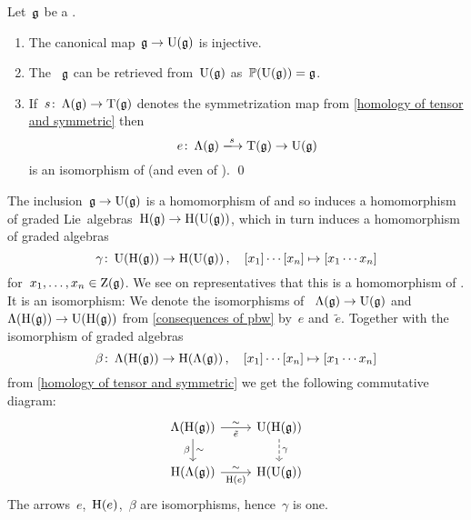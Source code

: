 \documentclass[a4paper,10pt,headings=standardclasses]{scrartcl}
\begin{document}
\begin{corollary}
  \label{consequences of pbw}
  Let~$\mathfrak{g}$ be a {\dgl}.
  \begin{enumerate}
    \item
      The canonical map~$\mathfrak{g} \to \operatorname{U}(\mathfrak{g})$ is injective.
    \item
      The {\dgl}~$\mathfrak{g}$ can be retrieved from~$\operatorname{U}(\mathfrak{g})$ as~$\mathbb{P}(\operatorname{U}(\mathfrak{g})) = \mathfrak{g}$.
    \item
      If~$s \colon \operatorname{\Lambda}(\mathfrak{g}) \to \operatorname{T}(\mathfrak{g})$ denotes the symmetrization map from \cref{homology of tensor and symmetric} then
      \[
        e
        \colon
        \dgSymm(\glie)
        \xlongto{s}
        \dgTensor(\glie)
        \to
        \Univ(\glie)
      \]
      is an isomorphism of {\dgvs} (and even of {\dgc}).
    \qed
  \end{enumerate}
\end{corollary}

\begin{example}
  The inclusion~$\mathfrak{g} \to \operatorname{U}(\mathfrak{g})$ is a homomorphism of {\dgl} and so induces a homomorphism of graded Lie~algebras~$\operatorname{H}(\mathfrak{g}) \to \operatorname{H}(\operatorname{U}(\mathfrak{g}))$, which in turn induces a homomorphism of graded algebras
  \[
    \gamma
    \colon
    \operatorname{U}(\operatorname{H}(\mathfrak{g}))
    \to
    \operatorname{H}(\operatorname{U}(\mathfrak{g})) \,,
    \quad
    [x_1] \dotsm [x_n]
    \mapsto
    [x_1 \dotsm x_n]
  \]
  for~$x_1, \dotsc, x_n \in \operatorname{Z}(\mathfrak{g})$.
  We see on representatives that this is a homomorphism of {\dghs}.
  It is an isomorphism:  
  We denote the isomorphisms of {\dgvs}~$\operatorname{\Lambda}(\mathfrak{g}) \to \operatorname{U}(\mathfrak{g})$ and~$\operatorname{\Lambda}(\operatorname{H}(\mathfrak{g})) \to \operatorname{U}(\operatorname{H}(\mathfrak{g}))$ from \cref{consequences of pbw} by~$e$ and~$\tilde{e}$.
  Together with the isomorphism of graded algebras
  \[
    \beta
    \colon
    \operatorname{\Lambda}(\operatorname{H}(\mathfrak{g}))
    \to
    \operatorname{H}(\operatorname{\Lambda}(\mathfrak{g})) \,,
    \quad
    [x_1] \dotsm [x_n]
    \mapsto
    [x_1 \dotsm x_n]
  \]
  from \cref{homology of tensor and symmetric} we get the following commutative diagram:
  \[
    \begin{tikzcd}
      \dgSymm(\homology(\glie))
      \arrow{r}[below]{\tilde{e}}[above]{\sim}
      \arrow{d}[left]{\beta}[right]{\sim}
      &
      \Univ(\homology(\glie))
      \arrow[dashed]{d}[right]{\gamma}
      \\
      \homology(\dgSymm(\glie))
      \arrow{r}[below]{\homology(e)}[above]{\sim}
      &
      \homology(\Univ(\glie))
    \end{tikzcd}
  \]
  The arrows~$e$,~$\operatorname{H}(e)$,~$\beta$ are isomorphisms, hence~$\gamma$ is one.
\end{example}
\end{document}
